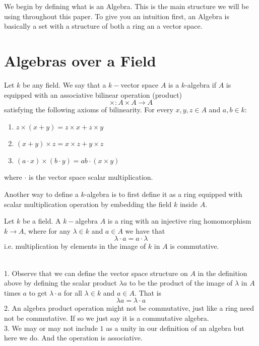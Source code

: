 We begin by defining what is an Algebra. This is the main structure we will be using throughout this paper. To give you an intuition first, an Algebra is basically a set with a structure of both a ring an a vector space.

\section{Algebras over a Field}


\begin{definition}[k-Algebra]
Let $k$ be any field. We say that a $k-$vector space $A$ is a $k$-algebra if $A$ is equipped with an associative bilinear operation (product)
\[
\times : A \times A \to A
\]
satisfying the following axioms of bilinearity.
For every $x,y,z \in A$ and $a,b \in k$:
\begin{enumerate}
    \item 
    
$    z \times (x+y) = z \times x + z\times y
$    
    \item
    
$    (x+y)\times z = x\times z + y \times z
$    
    \item
    
$    (a \cdot x)\times (b \cdot y) = ab \cdot (x\times y)
$    
    
\end{enumerate}
where $\cdot $ is the vector space scalar multiplication.
\end{definition}

Another way to define a $k$-algebra is to first define it as a ring equipped with scalar multiplication operation by embedding the field $k$ inside $A$.

\begin{definition}[k-Algerba]
    Let $k$ be a field. A $k-$algebra $A$ is a ring with an injective ring homomorphism $k \to A$, where for any $\lambda \in k$ and $a \in A$ we have that 
    \[
    \lambda \cdot a = a \cdot \lambda
    \]
i.e. multiplication by elements in the image of $k$ in $A$ is commutative.
\end{definition}

\begin{note}
    \\
    1. Observe that we can define the vector space structure on $A$ in the definition above by defining the scalar product $\lambda a $ to be the product of the image of $\lambda$ in $A$ times $a$ to get $\lambda \cdot a$ for all $\lambda \in k$ and $a \in A$. That is
    \[\lambda a = \lambda \cdot a\] 
   2. An algebra product operation might not be commutative, just like a ring need not be commutative. If so we just say it is a commutative algebra.\\
3. We may or may not include $1$ as a unity in our definition of an algebra but here we do. And the operation is associative.
\end{note}

